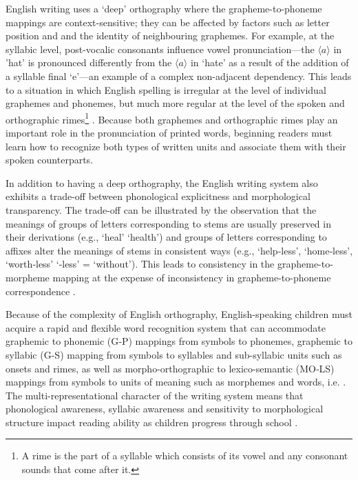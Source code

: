 \documentclass[review]{elsarticle}
\begin{document}
English writing uses a ‘deep’  orthography where the grapheme-to-phoneme mappings are  context-sensitive; they can be affected by factors such as letter position and and the identity of neighbouring graphemes. For example, at the syllabic level, post-vocalic consonants influence vowel pronunciation---the $\langle a\rangle$ in ’hat’ is pronounced differently from the  $\langle a\rangle$ in ‘hate’ as a result of the addition of a syllable final ‘e’---an example of a complex non-adjacent dependency. This leads to a situation in which English spelling is irregular at the level of individual graphemes and phonemes, but much more regular at the level of the spoken and orthographic rimes\footnote{A rime is the part of a syllable which consists of its vowel and any consonant sounds that come after it.} \citep{treiman_special_1995}. Because both graphemes and orthographic rimes play an important role in the pronunciation of printed words, beginning readers must learn how to recognize both types of written units and associate them with their spoken counterparts.

In addition to having a deep orthography, the English writing system also exhibits a trade-off between phonological explicitness and morphological transparency. The trade-off can be illustrated by the observation that the meanings of groups of letters corresponding to stems are usually preserved in their derivations (e.g., ‘heal’ \textrightarrow ‘health’) and groups of letters corresponding to affixes alter the meanings of stems in consistent ways (e.g., ‘help‑less’, ‘home‑less’, ‘worth‑less’ \textrightarrow ‘‑less’ = ‘without’).  This leads to consistency in the grapheme-to-morpheme mapping at the expense of inconsistency in grapheme-to-phoneme correspondence \citep{ziegler_reading_2005}.

Because of the complexity of English orthography, English-speaking children must acquire a rapid and flexible word recognition system that can accommodate graphemic to phonemic (G‑P) mappings from symbols to phonemes, graphemic to syllabic (G-S) mapping from symbols to syllables and sub-syllabic units such as onsets and rimes, as well as  morpho-orthographic to lexico-semantic (MO‑LS) mappings from symbols to units of meaning such as morphemes  and words, i.e.  \citep{ziegler_reading_2005}.  The multi-representational character of the  writing system means that  phonological awareness, syllabic awareness and sensitivity to morphological structure impact reading ability as children progress through school \citep{mahony_reading_2000-1}.  
\end{document}
